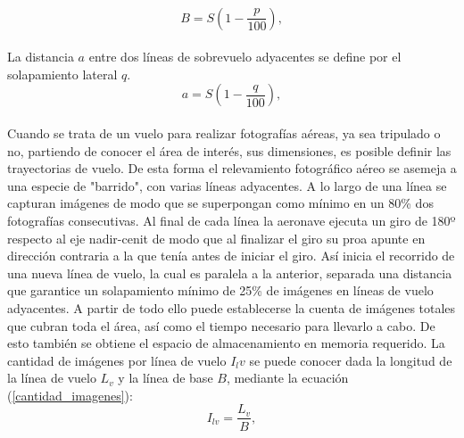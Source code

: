 \\
\begin{equation}
	B=S(1-\frac{p}{100}),\label{linea_de_base}
\end{equation}
\\
La distancia $a$ entre dos líneas de sobrevuelo adyacentes se define por el solapamiento lateral $q$.
\\
\begin{equation}
	a=S(1-\frac{q}{100}),\label{distancia_adyacente}
\end{equation}
\\
Cuando se trata de un vuelo para realizar fotografías aéreas, ya sea tripulado o no, partiendo de conocer el área de interés, sus dimensiones, es posible definir las trayectorias de vuelo. De esta forma el relevamiento fotográfico aéreo se asemeja a una especie de "barrido", con varias líneas adyacentes. A lo largo de una línea se capturan imágenes de modo que se superpongan como mínimo en un 80\% dos fotografías consecutivas. Al final de cada línea la aeronave ejecuta un giro de 180º respecto al eje nadir-cenit de modo que al finalizar el giro su proa apunte en dirección contraria a la que tenía antes de iniciar el giro. Así inicia el recorrido de una nueva línea de vuelo, la cual es paralela a la anterior, separada una distancia que garantice un solapamiento mínimo de 25\% de imágenes en líneas de vuelo adyacentes. A partir de todo ello puede establecerse la cuenta de imágenes totales que cubran toda el área, así como el tiempo necesario para llevarlo a cabo. De esto también se obtiene el espacio de almacenamiento en memoria requerido.
La cantidad de imágenes por línea de vuelo $I_lv$ se puede conocer dada la longitud de la línea de vuelo $L_v$ y la línea de base $B$, mediante la ecuación (\ref{cantidad_imagenes}):
\\
\begin{equation}
	I_{lv}=\frac{L_v}{B},\label{cantidad_imagenes}
\end{equation}
\\
